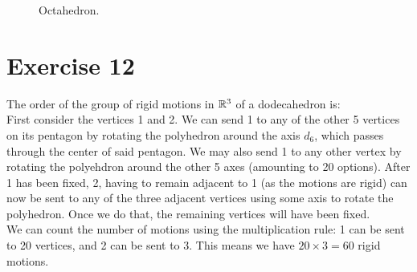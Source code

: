 \documentclass[12pt]{article}
\begin{document}
\begin{figure}[H]

        \caption{\label{fig:figure1} Octahedron.}
    \end{figure}


    \section*{Exercise 12}
    The order of the group of rigid motions in $\mathbb{R}^3$ of a dodecahedron is: \\
    First consider the vertices 1 and 2.
    We can send 1 to any of the other 5 vertices on its pentagon by
    rotating the polyhedron around the axis $d_6$, which passes through
    the center of said pentagon. We may also send 1 to any other vertex
    by rotating the polyehdron around the other 5 axes (amounting to 20 
    options).
    After 1 has been fixed, 2, having to remain adjacent to 1 (as the
    motions are rigid) can now be sent to any of the three adjacent vertices
    using some axis to rotate the polyhedron. Once we do that, the
    remaining vertices will have been fixed. \\
    We can count the number of motions using the multiplication rule:
    1 can be sent to 20 vertices, and 2 can be sent to 3. This means we
    have $20 \times 3 = 60$ rigid motions. 
\end{document}
